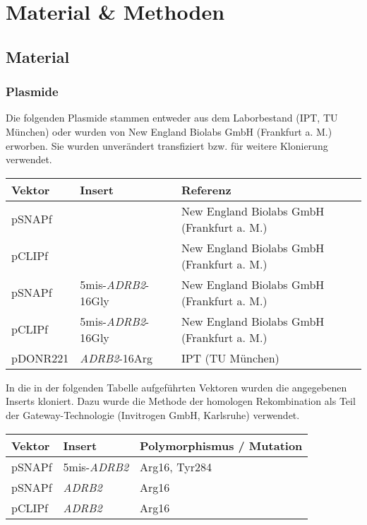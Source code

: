 \chapter{Material \& Methoden}\label{chapter:materialmethoden}

\section{Material}
\subsection{Plasmide} \label{plasmide}
Die folgenden Plasmide stammen entweder aus dem Laborbestand (IPT, TU München) oder wurden von New England Biolabs GmbH (Frankfurt a. M.) erworben. Sie wurden unverändert transfiziert bzw. für weitere Klonierung verwendet.

\begin{table}[htsb]
    \begin{tabular}{lll}
        \toprule
        Vektor		&	Insert						& 	Referenz	\\
        \midrule
        pSNAPf		&								&	New England Biolabs GmbH (Frankfurt a. M.)\\
        pCLIPf		&								&	New England Biolabs GmbH (Frankfurt a. M.)\\
        pSNAPf		&	5mis-\textit{ADRB2}-16Gly	&	New England Biolabs GmbH (Frankfurt a. M.)\\
        pCLIPf		&	5mis-\textit{ADRB2}-16Gly	&	New England Biolabs GmbH (Frankfurt a. M.)\\
        pDONR221	&	\textit{ADRB2}-16Arg	   		&	IPT (TU München)\\
    \bottomrule
    \end{tabular}
\end{table}

In die in der folgenden Tabelle aufgeführten Vektoren wurden die angegebenen Inserts kloniert. Dazu wurde die Methode der homologen Rekombination als Teil der Gateway-Technologie (Invitrogen GmbH, Karlsruhe) verwendet.

\begin{table}[htsb]
\begin{tabularx}{\textwidth}{lll}
\toprule
Vektor		&	Insert		&	Polymorphismus / Mutation\\
\midrule
pSNAPf		&	5mis-\textit{ADRB2}	&	Arg16, Tyr284\\
pSNAPf		&	\textit{ADRB2}		&	Arg16\\
pCLIPf		&	\textit{ADRB2}		&	Arg16\\
\bottomrule
\end{tabularx}
\end{table}

